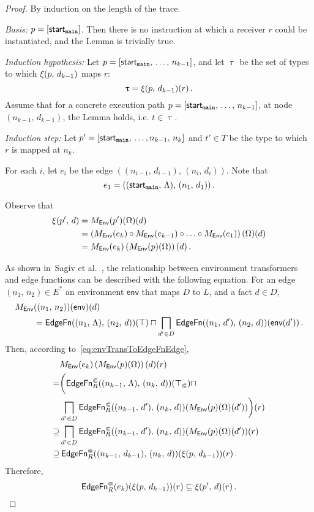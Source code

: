 \begin{proof}
  By induction on the length of the trace.
  
  \textit{Basis:} $p=[\textsf{start}_\texttt{main}]$. Then there is no instruction at which a receiver $r$ could be instantiated, and the Lemma is trivially true.    

  \textit{Induction hypothesis:} Let $p=[\textsf{start}_\texttt{main},\,\dots,\,n_{k-1}]$, and let $\uptau$ be the set of types to which $\xi(p,\,d_{k-1})$ maps $r$:
  \begin{equation}
    \uptau=\xi(p,\,d_{k-1})(r)\,.
  \end{equation}
  Assume that for a concrete execution path $p=[\textsf{start}_\texttt{main},\,\dots,\,n_{k-1}]$, at node $(n_{k-1},\,d_{k-1})$, the Lemma holds, i.e. $t\in\uptau$.
  
  \textit{Induction step:} Let $p'=[\textsf{start}_\texttt{main},\,\dots,n_{k-1},\,n_k]$ and $t'\in T$ be the type to which $r$ is mapped at $n_k$.
  
  For each $i$, let $e_i$ be the edge $((n_{i-1},\,d_{i-1}),\,(n_i,\,d_i))$. Note that $$e_1=((\textsf{start}_\texttt{main},\,\Lambda),\,(n_1,\,d_1))\,.$$  

  Observe that
  \begin{align*}
    \xi(p',\,d)
    &=M_\textsf{Env}(p')(\Omega)(d)\\
    &=\left(M_\textsf{Env}(e_k)\circ M_\textsf{Env}(e_{k-1})\circ\ldots\circ M_\textsf{Env}(e_1)\right)(\Omega)(d)\\
    &=M_\textsf{Env}(e_k)\left(M_\textsf{Env}(p)(\Omega)\right)(d)\,.
  \end{align*}
  
As shown in~Sagiv et al.~\cite{sagiv1996precise}, the relationship between environment transformers and edge functions can be described with the following equation. For an edge $(n_1,\,n_2)\in E^*$ an environment $\textsf{env}$ that maps $D$ to $L$, and a fact $d\in D$,
\begin{align}\label{eq:envTransToEdgeFnEdge}
  M_\textsf{Env}&((n_1,\,n_2))(\textsf{env})(d)\notag\\
  &=\textsf{EdgeFn}((n_1,\,\Lambda),\,(n_2,\,d))(\top)\sqcap\bigsqcap_{d'\in D}\textsf{EdgeFn}((n_1,\,d'),\,(n_2,\,d))(\textsf{env}(d'))\,.
\end{align}  
Then, according to~\eqref{eq:envTransToEdgeFnEdge},
  \begin{align*}
    &M_\textsf{Env}(e_k)\left(M_\textsf{Env}(p)(\Omega)\right)(d)(r)\\
      =&\bigg(\textsf{EdgeFn}^\Subset_{R}((n_{k-1},\,\Lambda),\,(n_k,\,d))(\top_\Subset)\sqcap\\
       &\bigsqcap_{d'\in D}\textsf{EdgeFn}^\Subset_{R}((n_{k-1},\,d'),\,(n_k,\,d))(M_\textsf{Env}(p)(\Omega)(d'))\bigg)(r)\\
      \supseteq&
        \bigsqcap_{d'\in D}\textsf{EdgeFn}^\Subset_{R}((n_{k-1},\,d'),\,(n_k,\,d))(M_\textsf{Env}(p)(\Omega)(d'))(r)\\
      \supseteq&\,\textsf{EdgeFn}^\Subset_{R}((n_{k-1},\,d_{k-1}),\,(n_k,\,d))(\xi(p,\,d_{k-1}))(r)\,.
  \end{align*}
  Therefore, 
  \begin{equation}\label{eq:musubset}
    \textsf{EdgeFn}^\Subset_{R}(e_k)(\xi(p,\,d_{k-1}))(r)\subseteq\xi(p',\,d)(r)\,.
  \end{equation}
  

\end{proof}
